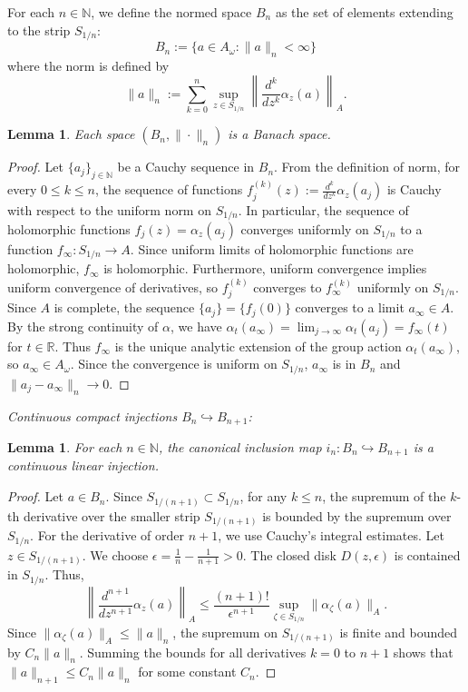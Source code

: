 \documentclass[11pt,reqno]{amsart}
\newtheorem{lemma}[theorem]{Lemma}
\theoremstyle{definition}
\numberwithin{equation}{section}
\begin{document}
For each $n \in \mathbb{N}$, we define the normed space $B_n$ as the set of elements extending to the strip $S_{1/n}$:
\[
B_n := \{a \in A_{\omega} : \|a\|_n < \infty\}
\]
where the norm is defined by
\[
\|a\|_n := \sum_{k=0}^n \sup_{z \in S_{1/n}} \left\| \frac{d^k}{dz^k}\alpha_z(a) \right\|_A.
\]

\begin{lemma}\label{5.7}
Each space $(B_n, \| \cdot \|_n)$ is a Banach space.
\end{lemma}

\begin{proof}
Let $\{a_j\}_{j \in \mathbb{N}}$ be a Cauchy sequence in $B_n$. From the definition of norm, for every $0 \le k \le n$, the sequence of functions $f^{(k)}_j(z) := \frac{d^k}{dz^k}\alpha_z(a_j)$ is Cauchy with respect to the uniform norm on $S_{1/n}$. In particular, the sequence of holomorphic functions $f_j(z) = \alpha_z(a_j)$ converges uniformly on $S_{1/n}$ to a function $f_{\infty} : S_{1/n} \rightarrow A$. Since uniform limits of holomorphic functions are holomorphic, $f_{\infty}$ is holomorphic. Furthermore, uniform convergence implies uniform convergence of derivatives, so $f^{(k)}_j$ converges to $f^{(k)}_{\infty}$ uniformly on $S_{1/n}$. Since $A$ is complete, the sequence $\{a_j\} = \{f_j(0)\}$ converges to a limit $a_{\infty} \in A$. By the strong continuity of $\alpha$, we have $\alpha_t(a_{\infty}) = \lim_{j \rightarrow \infty} \alpha_t(a_j) = f_{\infty}(t)$ for $t \in \mathbb{R}$. Thus $f_{\infty}$ is the unique analytic extension of the group action $\alpha_t(a_{\infty})$, so $a_{\infty} \in A_{\omega}$. Since the convergence is uniform on $S_{1/n}$, $a_{\infty}$ is in $B_n$ and $\|a_j - a_{\infty}\|_n \rightarrow 0$.
\end{proof}

\textit{Continuous compact injections $B_n \hookrightarrow B_{n+1}$:}
\begin{lemma}\label{5.8}
For each $n \in \mathbb{N}$, the canonical inclusion map $i_n: B_n \hookrightarrow B_{n+1}$ is a continuous linear injection.
\end{lemma}

\begin{proof}
Let $a \in B_n$. Since $S_{1/(n+1)} \subset S_{1/n}$, for any $k \le n$, the supremum of the $k$-th derivative over the smaller strip $S_{1/(n+1)}$ is bounded by the supremum over $S_{1/n}$. For the derivative of order $n+1$, we use Cauchy’s integral estimates. Let $z \in S_{1/(n+1)}$. We choose $\epsilon = \frac{1}{n} - \frac{1}{n+1} > 0$. The closed disk $D(z, \epsilon)$ is contained in $S_{1/n}$. Thus,
\[
\left\| \frac{d^{n+1}}{dz^{n+1}}\alpha_z(a) \right\|_A \le \frac{(n+1)!}{\epsilon^{n+1}} \sup_{\zeta \in S_{1/n}} \|\alpha_{\zeta}(a)\|_A.
\]
Since $\|\alpha_{\zeta}(a)\|_A \le \|a\|_n$, the supremum on $S_{1/(n+1)}$ is finite and bounded by $C_n\|a\|_n$. Summing the bounds for all derivatives $k = 0$ to $n+1$ shows that $\|a\|_{n+1} \le C_n\|a\|_n$ for some constant $C_n$.
\end{proof}
\end{document}
